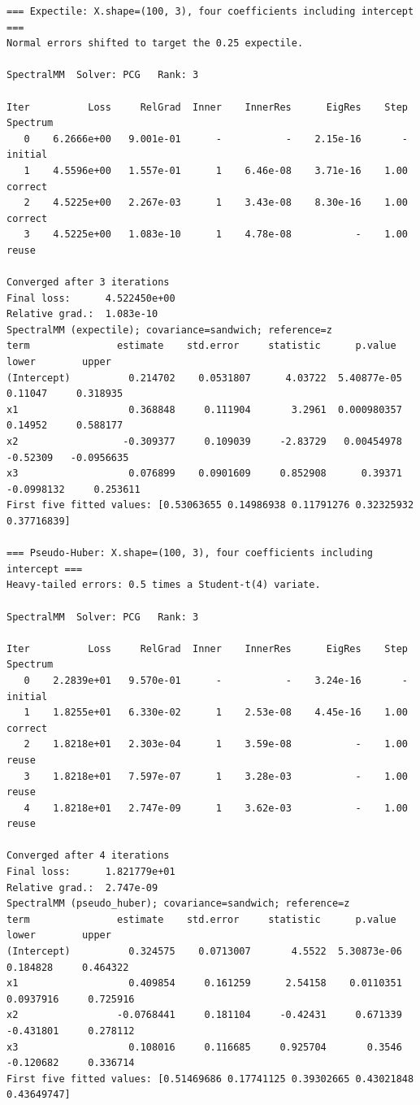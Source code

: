 \documentclass[11pt]{article}
\begin{document}
\begin{lstlisting}
=== Expectile: X.shape=(100, 3), four coefficients including intercept ===
Normal errors shifted to target the 0.25 expectile.

SpectralMM  Solver: PCG   Rank: 3

Iter          Loss     RelGrad  Inner    InnerRes      EigRes    Step  Spectrum
   0    6.2666e+00   9.001e-01      -           -    2.15e-16       -  initial
   1    4.5596e+00   1.557e-01      1    6.46e-08    3.71e-16    1.00  correct
   2    4.5225e+00   2.267e-03      1    3.43e-08    8.30e-16    1.00  correct
   3    4.5225e+00   1.083e-10      1    4.78e-08           -    1.00  reuse

Converged after 3 iterations
Final loss:      4.522450e+00
Relative grad.:  1.083e-10
SpectralMM (expectile); covariance=sandwich; reference=z
term               estimate    std.error     statistic      p.value        lower        upper
(Intercept)          0.214702    0.0531807      4.03722  5.40877e-05      0.11047     0.318935
x1                   0.368848     0.111904       3.2961  0.000980357      0.14952     0.588177
x2                  -0.309377     0.109039     -2.83729   0.00454978     -0.52309   -0.0956635
x3                   0.076899    0.0901609     0.852908      0.39371   -0.0998132     0.253611
First five fitted values: [0.53063655 0.14986938 0.11791276 0.32325932 0.37716839]

=== Pseudo-Huber: X.shape=(100, 3), four coefficients including intercept ===
Heavy-tailed errors: 0.5 times a Student-t(4) variate.

SpectralMM  Solver: PCG   Rank: 3

Iter          Loss     RelGrad  Inner    InnerRes      EigRes    Step  Spectrum
   0    2.2839e+01   9.570e-01      -           -    3.24e-16       -  initial
   1    1.8255e+01   6.330e-02      1    2.53e-08    4.45e-16    1.00  correct
   2    1.8218e+01   2.303e-04      1    3.59e-08           -    1.00  reuse
   3    1.8218e+01   7.597e-07      1    3.28e-03           -    1.00  reuse
   4    1.8218e+01   2.747e-09      1    3.62e-03           -    1.00  reuse

Converged after 4 iterations
Final loss:      1.821779e+01
Relative grad.:  2.747e-09
SpectralMM (pseudo_huber); covariance=sandwich; reference=z
term               estimate    std.error     statistic      p.value        lower        upper
(Intercept)          0.324575    0.0713007       4.5522  5.30873e-06     0.184828     0.464322
x1                   0.409854     0.161259      2.54158    0.0110351    0.0937916     0.725916
x2                 -0.0768441     0.181104     -0.42431     0.671339    -0.431801     0.278112
x3                   0.108016     0.116685     0.925704       0.3546    -0.120682     0.336714
First five fitted values: [0.51469686 0.17741125 0.39302665 0.43021848 0.43649747]


\end{lstlisting}
\end{document}

